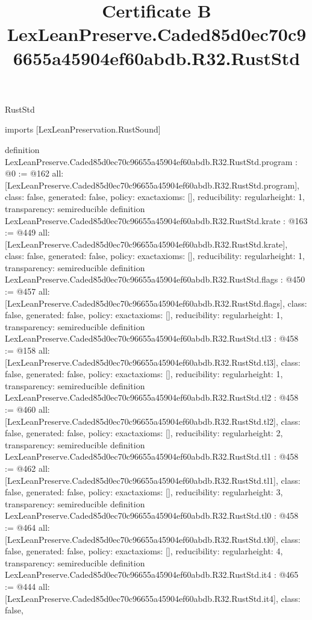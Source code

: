 \begin{lexlean}{RustStd}
\title{Certificate B LexLeanPreserve.Caded85d0ec70c96655a45904ef60abdb.R32.RustStd}
\begin{coremodule}
imports [LexLeanPreservation.RustSound]

definition LexLeanPreserve.Caded85d0ec70c96655a45904ef60abdb.R32.RustStd.program : @0 := @162 {
  all: [LexLeanPreserve.Caded85d0ec70c96655a45904ef60abdb.R32.RustStd.program],
  class: false,
  generated: false,
  policy: exact{axioms: []},
  reducibility: regular{height: 1},
  transparency: semireducible
}
definition LexLeanPreserve.Caded85d0ec70c96655a45904ef60abdb.R32.RustStd.krate : @163 := @449 {
  all: [LexLeanPreserve.Caded85d0ec70c96655a45904ef60abdb.R32.RustStd.krate],
  class: false,
  generated: false,
  policy: exact{axioms: []},
  reducibility: regular{height: 1},
  transparency: semireducible
}
definition LexLeanPreserve.Caded85d0ec70c96655a45904ef60abdb.R32.RustStd.flags : @450 := @457 {
  all: [LexLeanPreserve.Caded85d0ec70c96655a45904ef60abdb.R32.RustStd.flags],
  class: false,
  generated: false,
  policy: exact{axioms: []},
  reducibility: regular{height: 1},
  transparency: semireducible
}
definition LexLeanPreserve.Caded85d0ec70c96655a45904ef60abdb.R32.RustStd.tl3 : @458 := @158 {
  all: [LexLeanPreserve.Caded85d0ec70c96655a45904ef60abdb.R32.RustStd.tl3],
  class: false,
  generated: false,
  policy: exact{axioms: []},
  reducibility: regular{height: 1},
  transparency: semireducible
}
definition LexLeanPreserve.Caded85d0ec70c96655a45904ef60abdb.R32.RustStd.tl2 : @458 := @460 {
  all: [LexLeanPreserve.Caded85d0ec70c96655a45904ef60abdb.R32.RustStd.tl2],
  class: false,
  generated: false,
  policy: exact{axioms: []},
  reducibility: regular{height: 2},
  transparency: semireducible
}
definition LexLeanPreserve.Caded85d0ec70c96655a45904ef60abdb.R32.RustStd.tl1 : @458 := @462 {
  all: [LexLeanPreserve.Caded85d0ec70c96655a45904ef60abdb.R32.RustStd.tl1],
  class: false,
  generated: false,
  policy: exact{axioms: []},
  reducibility: regular{height: 3},
  transparency: semireducible
}
definition LexLeanPreserve.Caded85d0ec70c96655a45904ef60abdb.R32.RustStd.tl0 : @458 := @464 {
  all: [LexLeanPreserve.Caded85d0ec70c96655a45904ef60abdb.R32.RustStd.tl0],
  class: false,
  generated: false,
  policy: exact{axioms: []},
  reducibility: regular{height: 4},
  transparency: semireducible
}
definition LexLeanPreserve.Caded85d0ec70c96655a45904ef60abdb.R32.RustStd.it4 : @465 := @444 {
  all: [LexLeanPreserve.Caded85d0ec70c96655a45904ef60abdb.R32.RustStd.it4],
  class: false,
}
\end{coremodule}
\end{lexlean}
